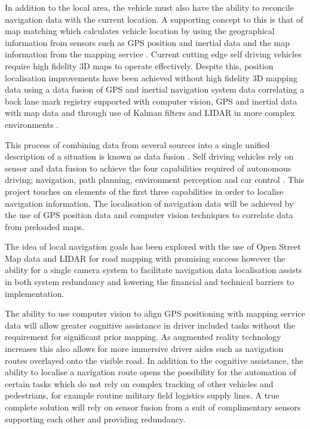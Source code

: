 \documentclass[]{aiaa-tc}%
\begin{document}
In addition to the local area, the vehicle must also have the ability to reconcile navigation data with the current location. A supporting concept to this is that of map matching which calculates vehicle location by using the geographical information from sensors such as GPS position and inertial data and the map information from the mapping service \citep{keyTechSelfDriving}. Current cutting edge self driving vehicles require high fidelity 3D maps to operate effectively. Despite this, position localisation improvements have been achieved without high fidelity 3D mapping data using a data fusion of GPS and inertial navigation system data \citep{gpsInsFusion} correlating a back lane mark registry supported with computer vision, GPS and inertial data with map data \citep{lowCostSensorNav} and through use of Kalman filters and LIDAR in more complex environments \citep{robotLIDARSLAM}.

This process of combining data from several sources into a single unified description of a situation is known as data fusion \citep{gpsInsFusion}. Self driving vehicles rely on sensor and data fusion to achieve the four capabilities required of autonomous driving; navigation, path planning, environment perception and car control \citep{keyTechSelfDriving}. This project touches on elements of the first three capabilities in order to localise navigation information. The localisation of navigation data will be achieved by the use of GPS position data and computer vision techniques to correlate data from preloaded maps. 

The idea of local navigation goals has been explored with the use of Open Street Map data and LIDAR for road mapping with promising success \citep{mitLocalNavDriving} however the ability for a single camera system to facilitate navigation data localisation assists in both system redundancy and lowering the financial and technical barriers to implementation.

The ability to use computer vision to align GPS positioning with mapping service data will allow greater cognitive assistance in driver included tasks without the requirement for significant prior mapping. As augmented reality technology increases this also allows for more immersive driver aides such as navigation routes overlayed onto the visible road. In addition to the cognitive assistance, the ability to localise a navigation route opens the possibility for the automation of certain tasks which do not rely on complex tracking of other vehicles and pedestrians, for example routine military field logistics supply lines. A true complete solution will rely on sensor fusion from a suit of complimentary sensors supporting each other and providing redundancy. 
\end{document}
